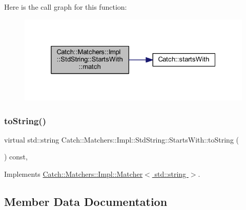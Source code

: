 Here is the call graph for this function\+:\nopagebreak
\begin{figure}[H]
\begin{center}
\leavevmode
\includegraphics[width=325pt]{struct_catch_1_1_matchers_1_1_impl_1_1_std_string_1_1_starts_with_ab8f8d15e06d7ec13fee7d9ec4075dafa_cgraph}
\end{center}
\end{figure}
\hypertarget{struct_catch_1_1_matchers_1_1_impl_1_1_std_string_1_1_starts_with_a85a24e2ac23025edbe31cbf5bb755fb3}{}\label{struct_catch_1_1_matchers_1_1_impl_1_1_std_string_1_1_starts_with_a85a24e2ac23025edbe31cbf5bb755fb3} 
\subsubsection{\texorpdfstring{to\+String()}{toString()}}
{\footnotesize\ttfamily virtual std\+::string Catch\+::\+Matchers\+::\+Impl\+::\+Std\+String\+::\+Starts\+With\+::to\+String (\begin{DoxyParamCaption}{ }\end{DoxyParamCaption}) const\hspace{0.3cm}{\ttfamily [inline]}, {\ttfamily [virtual]}}



Implements \hyperlink{struct_catch_1_1_matchers_1_1_impl_1_1_matcher_a091bcc37e589967d7e10fc7790d820e2}{Catch\+::\+Matchers\+::\+Impl\+::\+Matcher$<$ std\+::string $>$}.



\subsection{Member Data Documentation}
\hypertarget{struct_catch_1_1_matchers_1_1_impl_1_1_std_string_1_1_starts_with_accaace83106244c635d251addb028125}{}\label{struct_catch_1_1_matchers_1_1_impl_1_1_std_string_1_1_starts_with_accaace83106244c635d251addb028125} 
